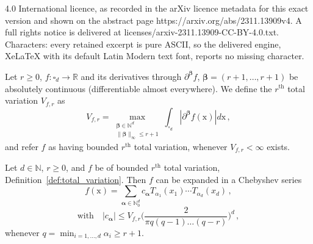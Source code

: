 \documentclass[10pt,a4paper]{amsart}
\newcommand{\N}{\mathbb{N}}
\newcommand{\R}{\mathbb{R}}
\newcommand{\p}{\partial}
\begin{document}
4.0 International licence, as recorded in the arXiv licence metadata for this exact version and shown on the abstract page https://arxiv.org/abs/2311.13909v4. A full rights notice is delivered at licenses/arxiv-2311.13909-CC-BY-4.0.txt. Characters: every retained excerpt is pure ASCII, so the delivered engine, XeLaTeX with its default Latin Modern text font, reports no missing character.
\begin{definition}
\label{def:total_variation}
Let $r \geq 0$, $f: \square_d \to \R$ and its derivatives through $\p^{\boldsymbol{\beta}} f$, $\boldsymbol{\beta} = (r+1,\dots,r+1)$ be absolutely continuous (differentiable almost everywhere). We define the $r^{\text{th}}$ total variation $V_{f,r}$ as
\begin{equation}\label{eq:var}
   V_{f,r}=\max_{\substack{\boldsymbol{\beta} \in \N^d \\ \|\boldsymbol{\beta}\|_\infty \leq r+1}}\int_{\square_d} |\p^{\boldsymbol{\beta}}f(\mathrm{x})| d\mathrm{x} \,, 
\end{equation}
and refer $f$ as having bounded $r^{\text{th}}$ total variation, whenever $V_{f,r} < \infty$ exists.
\end{definition}

 \begin{theorem}\label{theo:TRUNC}  Let $d\in\N$, $r\geq 0$, and $f$ be of bounded $r^{\text{th}}$ total variation, Definition~\ref{def:total_variation}. 
Then $f$ can be expanded in a Chebyshev series
\begin{equation*}
f(\mathrm{x})   =\sum_{\boldsymbol{\alpha}\in \N_0^d}c_{\boldsymbol{\alpha}} T_{\alpha_1}(x_1)\cdots T_{\alpha_d}(x_d)\,,
\end{equation*}
\begin{equation}\label{eq:bound}
    \text{with} \quad
|c_{\boldsymbol{\alpha}}|\leq V_{f,r}\Big(\frac{2}{ \pi q(q-1)\ldots(q-r)}\Big)^{d} \,,
\end{equation}
whenever $q =\min_{i=1,\dots,d} \alpha_i  \geq r+1$.
\end{theorem}
\end{document}
